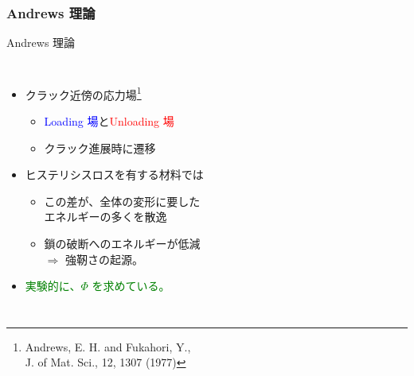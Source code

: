 \documentclass[12pt, dvipdfmx]{beamer}
\begin{document}
\begin{frame}
	\frametitle{Andrews 理論}
	\vspace{-2mm}
	\begin{exampleblock}{Andrews 理論}
		\begin{columns}[totalwidth=1\textwidth]
			\begin{itemize}
			\item クラック近傍の応力場\footnote{
					Andrews, E. H. and Fukahori, Y., \\J. of Mat. Sci., 12, 1307 (1977)
					}
					\begin{itemize}
						\item \textcolor{blue}{Loading 場}と\textcolor{red}{Unloading 場}
						\item クラック進展時に遷移
					\end{itemize}
			\item ヒステリシスロスを有する材料では
				\begin{itemize}
				\item
				\alert{この差}が、全体の変形に要した\\エネルギーの多くを\alert{散逸}
				\item
			鎖の破断へのエネルギーが低減 \\$\Rightarrow$ \alert{強靭さの起源。}
				\end{itemize}	
			\item \textcolor{green}{実験的に、$\Phi$ を求めている。}
			\end{itemize}
		

\end{columns}
\end{exampleblock}
\end{frame}
\end{document}
